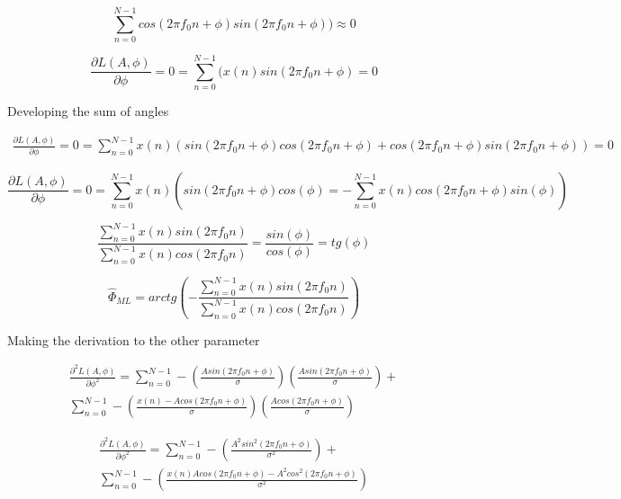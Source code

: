 \documentclass{report}
\begin{document}
\begin{equation}\label{entitycossin}
\sum_{n=0}^{N-1}cos(2\pi f_0 n +\phi)sin(2\pi f_0 n +\phi)) \approx 0
\end{equation}

\begin{equation}\label{key}
\frac{\partial L(A,\phi)}{\partial \phi} = 0 = \sum_{n=0}^{N-1}(x(n)sin(2\pi f_0 n +\phi) = 0
\end{equation}

Developing the sum of angles

\begin{gather*} 
\frac{\partial L(A,\phi)}{\partial \phi} = 0 = \sum_{n=0}^{N-1}x(n)(sin(2\pi f_0 n +\phi)cos(2\pi f_0 n +\phi) + cos(2\pi f_0 n +\phi)sin(2\pi f_0 n +\phi)) = 0
\end{gather*}

\begin{equation}\label{key}
\frac{\partial L(A,\phi)}{\partial \phi} = 0 = \sum_{n=0}^{N-1}x(n)(sin(2\pi f_0 n +\phi)cos(\phi) = - \sum_{n=0}^{N-1}x(n)cos(2\pi f_0 n +\phi)sin(\phi)) 
\end{equation}



\begin{equation}\label{key}
\frac{\sum_{n=0}^{N-1}x(n)sin(2\pi f_0 n)}{\sum_{n=0}^{N-1}x(n)cos(2\pi f_0 n )} = \frac{sin(\phi )}{cos(\phi)} = tg(\phi)
\end{equation}


\begin{equation}\label{key}
\hat{\Phi}_{ML} = arctg(-\frac{\sum_{n=0}^{N-1}x(n)sin(2\pi f_0 n)}{\sum_{n=0}^{N-1}x(n)cos(2\pi f_0 n )})
\end{equation}


Making the derivation to the other parameter


\begin{gather*}\label{key}
\frac{\partial^2 L(A,\phi)}{\partial \phi^2} = \sum_{n=0}^{N-1} - (\frac{Asin(2\pi f_0 n +\phi)}{\sigma}) (\frac{Asin(2\pi f_0 n +\phi)}{\sigma})+\\
\sum_{n=0}^{N-1} - (\frac{x(n)-Acos(2\pi f_0 n +\phi)}{\sigma}) (\frac{Acos(2\pi f_0 n +\phi)}{\sigma})
\end{gather*}


\begin{gather*}\label{key}
\frac{\partial^2 L(A,\phi)}{\partial \phi^2} = \sum_{n=0}^{N-1} - (\frac{A^2sin^2(2\pi f_0 n +\phi)}{\sigma^2})+\\
\sum_{n=0}^{N-1} - (\frac{x(n)Acos(2\pi f_0 n +\phi)-A^2cos^2(2\pi f_0 n +\phi)}{\sigma^2})
\end{gather*}
\end{document}

